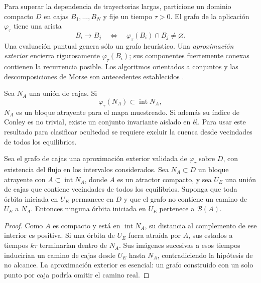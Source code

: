 Para superar la dependencia de trayectorias largas, particione un dominio
compacto $D$ en cajas $B_1,\ldots,B_N$ y fije un tiempo $\tau>0$. El grafo de
la aplicación $\varphi_\tau$ tiene una arista
\begin{equation}
 B_i\longrightarrow B_j
 \quad\Longleftrightarrow\quad
 \varphi_\tau(B_i)\cap B_j\ne\varnothing.
 \label{gt:eq:box-graph}
\end{equation}
Una evaluación puntual genera sólo un grafo heurístico. Una
\emph{aproximación exterior} encierra rigurosamente
$\varphi_\tau(B_i)$; sus componentes fuertemente conexas contienen la
recurrencia posible. Los algoritmos orientados a conjuntos y las
descomposiciones de Morse son antecedentes establecidos
\cite{DellnitzHohmann1997Subdivision,KaliesEtAl2005ChainRecurrence,
MischaikowEtAl2016Conley}.

Sea $N_A$ una unión de cajas. Si
\begin{equation}
 \varphi_\tau(N_A)\subset\operatorname{int}N_A,
 \label{gt:eq:attracting-block}
\end{equation}
$N_A$ es un bloque atrayente para el mapa muestreado. Si además su índice de
Conley es no trivial, existe un conjunto invariante aislado en él. Para usar
este resultado para clasificar ocultedad se requiere excluir la cuenca desde
vecindades de todos los equilibrios.

\begin{proposition}
\label{prop:gt-relative-hiddenness}
Sea el grafo de cajas una aproximación exterior validada de
$\varphi_\tau$ sobre $D$, con existencia del flujo en los intervalos
considerados. Sea $N_A\subset D$ un bloque atrayente con
$A\subset\operatorname{int}N_A$, donde $A$ es un atractor compacto,
y sea $U_E$ una unión de cajas que contiene vecindades de todos
los equilibrios. Suponga que toda órbita iniciada en $U_E$ permanece en $D$ y
que el grafo no contiene un camino de $U_E$ a $N_A$. Entonces ninguna órbita
iniciada en $U_E$ pertenece a $\mathcal B(A)$.
\end{proposition}

\begin{proof}
Como $A$ es compacto y está en $\operatorname{int}N_A$, su distancia al
complemento de ese interior es positiva. Si una órbita de $U_E$ fuera
atraída por $A$, sus estados a tiempos $k\tau$ terminarían dentro de
$N_A$. Sus imágenes sucesivas a esos tiempos inducirían
un camino de cajas desde $U_E$ hasta $N_A$, contradiciendo la hipótesis de no
alcance. La aproximación exterior es esencial: un grafo construido con un solo
punto por caja podría omitir el camino real.
\end{proof}

